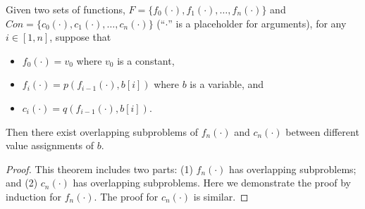 \begin{theorem}
\label{thm2}
Given two sets of functions, $F=\{f_0(\cdot), f_1(\cdot), \ldots, f_n(\cdot)\}$ and $Con=\{c_0(\cdot), c_1(\cdot), \ldots, c_n(\cdot)\}$ (``$\cdot$'' is a placeholder for arguments), for 
any $i\in[1, n]$, suppose that 
\begin{itemize}
\item $f_0(\cdot)=v_0$ where $v_0$ is a constant, 
\item $f_i(\cdot)=p(f_{i-1}(\cdot), b[i])$ where $b$ is a variable, and
\item $c_i(\cdot)=q(f_{i-1}(\cdot), b[i])$. 
\end{itemize}
Then there exist overlapping subproblems of $f_n(\cdot)$ and $c_n(\cdot)$ 
between different value assignments of $b$.
\end{theorem}
\begin{proof}
This theorem includes two parts: 
(1) $f_n(\cdot)$ has overlapping subproblems; and (2)  $c_n(\cdot)$ has overlapping subproblems. Here we demonstrate the proof by induction for $f_n(\cdot)$. 
The proof for $c_n(\cdot)$ is similar. 


\end{proof}
